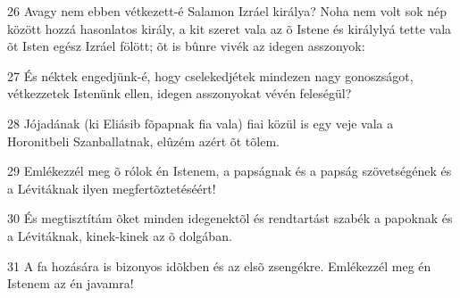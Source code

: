 \par 26 Avagy nem ebben vétkezett-é Salamon Izráel királya? Noha nem volt sok nép között hozzá hasonlatos király, a kit szeret vala az õ Istene és királylyá tette vala õt Isten egész Izráel fölött; õt is bûnre vivék az  idegen asszonyok:
\par 27 És néktek engedjünk-é, hogy cselekedjétek mindezen nagy gonoszságot, vétkezzetek Istenünk ellen, idegen asszonyokat vévén feleségül?
\par 28 Jójadának (ki Eliásib fõpapnak fia vala) fiai közül is egy veje vala a Horonitbeli Szanballatnak, elûzém azért õt tõlem.
\par 29 Emlékezzél meg õ rólok én Istenem, a papságnak és a papság szövetségének és a Lévitáknak ilyen megfertõztetéséért!
\par 30 És megtisztítám õket minden idegenektõl és rendtartást szabék a papoknak és a Lévitáknak, kinek-kinek az õ dolgában.
\par 31 A fa hozására is bizonyos idõkben és az elsõ zsengékre. Emlékezzél meg én Istenem az én javamra!


